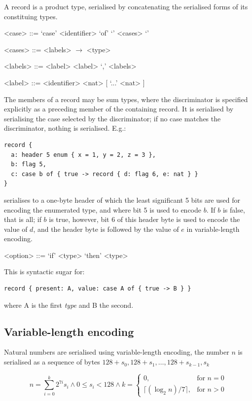 \documentclass[a4paper,oneside,article]{memoir}
\begin{document}
A record is a product type, serialised by concatenating the serialised forms of its constituing
types.
  
\begin{grammar}
  <case> ::= `case' <identifier> `of' `{' <cases> `}'
  
  <cases> ::= <labels> $\rightarrow$ <type>
  
  <labels> ::= <label> \alt <label> `,' <labels>
  
  <label> ::= <identifier> \alt <nat> [ `...' <nat> ]
\end{grammar}

The members of a record may be sum types, where the discriminator is specified explicitly as a
preceding member of the containing record.  It is serialised by serialising the case selected by the
discriminator; if no case matches the discriminator, nothing is serialised.  E.g.:
\begin{verbatim}
record {
  a: header 5 enum { x = 1, y = 2, z = 3 },
  b: flag 5,
  c: case b of { true -> record { d: flag 6, e: nat } }
}
\end{verbatim}
serialises to a one-byte header of which the least significant 5 bits are used for encoding the
enumerated type, and where bit 5 is used to encode $b$.  If $b$ is false, that is all; if $b$ is
true, however, bit 6 of this header byte is used to encode the value of $d$, and the header byte is
followed by the value of $e$ in variable-length encoding.

\begin{grammar}
  <option> ::= `if' <type> `then' <type>
\end{grammar}

This is syntactic sugar for:
\begin{verbatim}
record { present: A, value: case A of { true -> B } }
\end{verbatim}
where A is the first \emph{type} and B the second.

\subsection{Variable-length encoding}

Natural numbers are serialised using variable-length encoding, the number $n$ is serialised as a sequence of bytes $128 + s_0, 128 + s_1, \ldots{}, 128 + s_{k-1}, s_k$

\[
  n = \sum_{i=0}^k 2^{7i}s_i \wedge 0 \leq s_i < 128 \wedge k = \left. \begin{cases}
      0, & \text{for } n = 0 \\
      \lceil (\log_2 n)/7 \rceil, & \text{for } n > 0
      \end{cases} \right.
\]
\end{document}
